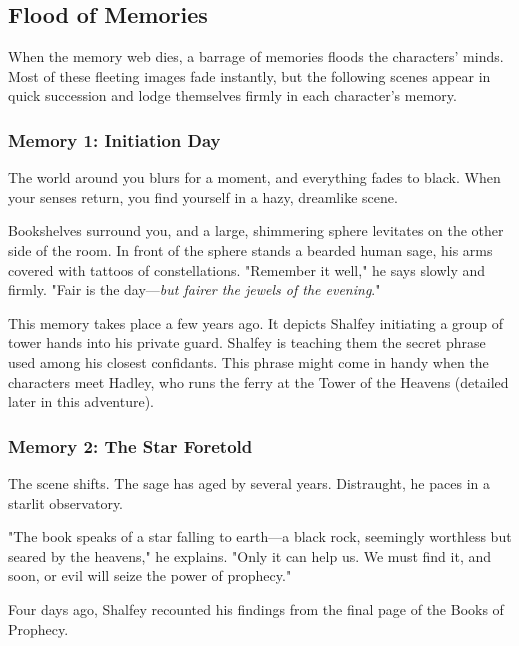 \documentclass[10pt,a4paper,twoside,bg=print,twocolumn,openany,nodeprecatedcode]{dndbook}
\begin{document}
\subsection{Flood of Memories}
When the memory web dies, a barrage of memories floods the characters' minds. Most of these fleeting images fade instantly, but the following scenes appear in quick succession and lodge themselves firmly in each character's memory.

\subsubsection{Memory 1: Initiation Day}
\begin{DndReadAloud}{}
The world around you blurs for a moment, and everything fades to black. When your senses return, you find yourself in a hazy, dreamlike scene.

Bookshelves surround you, and a large, shimmering sphere levitates on the other side of the room. In front of the sphere stands a bearded human sage, his arms covered with tattoos of constellations. "Remember it well," he says slowly and firmly. "Fair is the day—\textit{but fairer the jewels of the evening}."

\end{DndReadAloud}

This memory takes place a few years ago. It depicts Shalfey initiating a group of tower hands into his private guard. Shalfey is teaching them the secret phrase used among his closest confidants. This phrase might come in handy when the characters meet Hadley, who runs the ferry at the Tower of the Heavens (detailed later in this adventure).

\subsubsection{Memory 2: The Star Foretold}
\begin{DndReadAloud}{}
The scene shifts. The sage has aged by several years. Distraught, he paces in a starlit observatory.

"The book speaks of a star falling to earth—a black rock, seemingly worthless but seared by the heavens," he explains. "Only it can help us. We must find it, and soon, or evil will seize the power of prophecy."

\end{DndReadAloud}

Four days ago, Shalfey recounted his findings from the final page of the Books of Prophecy.
\end{document}
